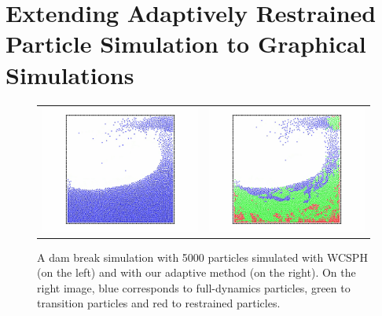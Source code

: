 \chapter{Extending Adaptively Restrained Particle Simulation to Graphical Simulations}
\label{chap:arps}

\begin{figure}[!h]
    \begin{tabular}{cc}
        \includegraphics[width=0.4\linewidth]{images/arps-vriphys2013/ReposSPHClassique1.jpg} &
        \includegraphics[width=0.4\linewidth]{images/arps-vriphys2013/ReposSPHARPSColor1.jpg}
    \end{tabular}
 \centering
 \caption[ARPS: Dam break simulations]{ A dam break simulation with 5000 particles simulated with WCSPH (on the left)
 and with our adaptive method (on the right). On the right image, blue corresponds to full-dynamics particles, green to transition particles and red to restrained particles.}
\label{fig:ARPS_Teaser}
\end{figure}

